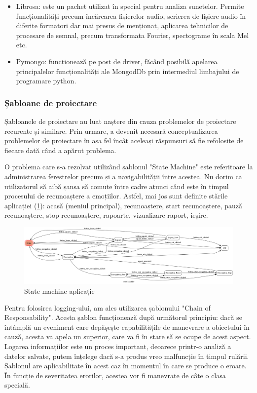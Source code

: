 \documentclass[a4paper, 12pt]{report}
\begin{document}
\begin{itemize}
		\item Librosa: este un pachet utilizat în special pentru analiza sunetelor. Permite funcționalități precum încărcarea fișierelor audio, scrierea de fișiere audio în diferite formatori dar mai presus de menționat, aplicarea tehnicilor de procesare de semnal, precum transformata Fourier, spectograme în scala Mel etc.
	
		\item Pymongo: funcționează pe post de driver, făcând posibilă apelarea principalelor funcționalități ale MongodDb prin intermediul limbajului de programare python.
	\end{itemize}
	
	\subsubsection{Șabloane de proiectare}
	Șabloanele de proiectare au luat naștere din cauza problemelor de proiectare recurente și similare. Prin urmare, a devenit necesară conceptualizarea problemelor de proiectare în așa fel încât aceleași răspunsuri să fie refolosite de fiecare dată când a apărut problema.

	O problema care s-a rezolvat utilizând șablonul "State Machine" este referitoare la administrarea ferestrelor precum și a navigabilității între acestea. Nu dorim ca utilizatorul să aibă șansa să comute între cadre atunci când este în timpul procesului de recunoaștere a emoțiilor. Astfel, mai jos sunt definite stările aplicației (\ref{fig:state}): acasă (meniul principal), recunoaștere, start recunoaștere, pauză recunoaștere, stop recunoaștere, rapoarte, vizualizare raport, ieșire.
	
	\begin{figure}[H]
		\begin{center}
			\includegraphics[scale=0.2]{images/state_diagram.png}
		\end{center}
		\caption{State machine aplicație}
		\label{fig:state}
	\end{figure} 	
	
	Pentru folosirea logging-ului, am ales utilizarea șablonului "Chain of Responsability". Acesta șablon funcționează după următorul principiu: dacă se întâmplă un eveniment care depășește capabilitățile de manevrare a obiectului în cauză, acesta va apela un superior, care va fi în stare să se ocupe de acest aspect. Logarea informațiilor este un proces important, deoarece printr-o analiză a datelor salvate, putem înțelege dacă s-a produs vreo malfuncție în timpul rulării. Șablonul are aplicabilitate în acest caz în momentul în care se produce o eroare. În funcție de severitatea erorilor, acestea vor fi manevrate de câte o clasa specială. 
	
\end{document}
